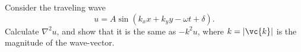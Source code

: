 Consider the traveling wave
\begin{equation*}
  u = A\sin(k_x x+k_y y-\omega t+\delta).
\end{equation*}
Calculate $\nabla^2 u$, and show that it is the same
as $-k^2 u$, where $k=|\vc{k}|$ is the magnitude of the
wave-vector.
